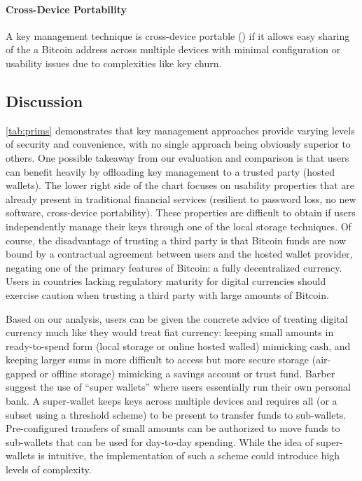 \paragraph{Cross-Device Portability}
\label{Portable}
A key management technique is cross-device portable (\full) if it allows easy sharing of the a Bitcoin address across multiple devices with minimal configuration or usability issues due to complexities like key churn.

\subsection{Discussion}
\autoref{tab:prims} demonstrates that key management approaches provide varying levels of security and convenience, with no single approach being obviously superior to others. One possible takeaway from our evaluation and comparison is that users can benefit heavily by offloading key management to a trusted party (\eg hosted wallets). The lower right side of the chart focuses on usability properties that are already present in traditional financial services (\ie resilient to password loss, no new software, cross-device portability). These properties are difficult to obtain if users independently manage their keys through one of the local storage techniques. Of course, the disadvantage of trusting a third party is that Bitcoin funds are now bound by a contractual agreement between users and the hosted wallet provider, negating one of the primary features of Bitcoin: a fully decentralized currency. Users in countries lacking regulatory maturity for digital currencies should exercise caution when trusting a third party with large amounts of Bitcoin. 

Based on our analysis, users can be given the concrete advice of treating digital currency much like they would treat fiat currency: keeping small amounts in ready-to-spend form (\eg local storage or online hosted walled) mimicking cash, and keeping larger sums in more difficult to access but more secure storage (\eg air-gapped or offline storage) mimicking a savings account or trust fund. Barber \etal~\cite{Barber2012} suggest the use of ``super wallets'' where users essentially run their own personal bank. A super-wallet keeps keys across multiple devices and requires all (or a subset using a threshold scheme) to be present to transfer funds to sub-wallets. Pre-configured transfers of small amounts can be authorized to move funds to sub-wallets that can be used for day-to-day spending. While the idea of super-wallets is intuitive, the implementation of such a scheme could introduce high levels of complexity. 



